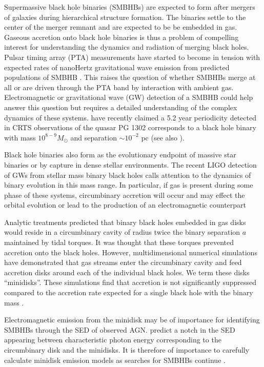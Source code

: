\documentclass{emulateapj}
\begin{document}
Supermassive black hole binaries (SMBHBs) are expected to form after mergers of galaxies during hierarchical structure formation.  The binaries settle to the center of the merger remnant and are expected to be be embedded in gas. Gaseous accretion onto black hole binaries is thus a problem of compelling interest for understanding the dynamics and radiation of merging black holes. Pulsar timing array (PTA) measurements have started to become in tension with expected rates of nanoHertz gravitational wave emission from predicted populations of SMBHB \citep{Shannon15}. This raises the question of whether SMBHBs merge at all or are driven through the PTA band by interaction with ambient gas. Electromagnetic or gravitational wave (GW) detection of a SMBHB could help answer this question but requires a detailed understanding of the complex dynamics of these systems. \cite{Graham15A} have recently claimed a 5.2 year periodicity detected in CRTS observations of the quasar PG 1302 corresponds to a black hole binary with mass $10^{8-9}M_{\odot}$ and separation $\sim 10^{-2}$ pc (see also \citep{Graham15B}). 

Black hole binaries also form as the evolutionary endpoint of massive star binaries or by capture in dense stellar environments. The recent LIGO detection of GWs from stellar mass binary black holes calls attention to the dynamics of binary evolution in this mass range. In particular, if gas is present during some phase of these systems, circumbinary accretion will occur and may effect the orbital evolution or lead to the production of an electromagnetic counterpart \citep{Bartos16, Perna16}

Analytic treatments \citep{Milos05,Shapiro10} predicted that binary black holes embedded in gas disks would reside in a circumbinary cavity of radius twice the binary separation $a$ maintained by tidal torques. It was thought that these torques prevented accretion onto the black holes. However, multidimensional numerical simulations \citep{MacFadyen08, Noble12, Farris12, DOrazio12,Gold14, Farris14, Farris15A, Farris15B,Shi15, Bankert15,Schnittman15,delValle15,Young15,DOrazio16, Munoz16,Miranda16} have demonstrated that gas streams enter the circumbinary cavity and feed accretion disks around each of the individual black holes. We term these disks ``minidisks''. These simulations find that accretion is not significantly suppressed compared to the accretion rate expected for a single black hole with the binary mass \citep{Farris14,Shi15}.

Electromagnetic emission from the minidisk may be of importance for identifying SMBHBs through the SED of observed AGN. \cite{Roedig14} predict a notch in the SED appearing between characteristic photon energy corresponding to the circumbinary disk and the minidisks. It is therefore of importance to carefully calculate minidisk emission models as searches for SMBHBs continue \citep{Runnoe15,Li16,Charisi16}.
\end{document}
